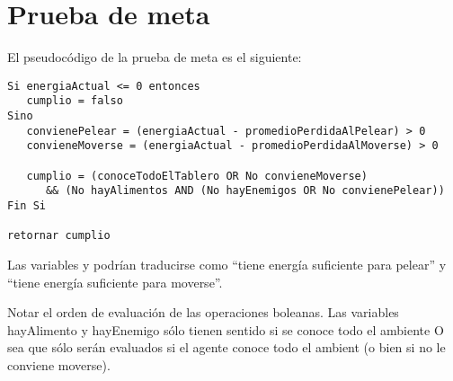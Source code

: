 \section{Prueba de meta}

El pseudocódigo de la prueba de meta es el siguiente:

\begin{verbatim}
Si energiaActual <= 0 entonces
   cumplio = falso
Sino
   convienePelear = (energiaActual - promedioPerdidaAlPelear) > 0
   convieneMoverse = (energiaActual - promedioPerdidaAlMoverse) > 0

   cumplio = (conoceTodoElTablero OR No convieneMoverse)
      && (No hayAlimentos AND (No hayEnemigos OR No convienePelear))
Fin Si

retornar cumplio
\end{verbatim}

Las variables  y  podrían
traducirse como ``tiene energía suficiente para pelear'' y ``tiene energía
suficiente para moverse''.

Notar el orden de evaluación de las operaciones boleanas. Las variables
hayAlimento y hayEnemigo sólo tienen sentido si se conoce todo el ambiente
O sea que sólo serán evaluados si el agente conoce todo el ambient
(o bien si no le conviene moverse).

